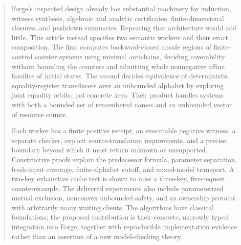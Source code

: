 \documentclass[11pt,a4paper]{article}
\theoremstyle{definition}
\theoremstyle{remark}
\begin{document}
\begin{abstract}
Forge's inspected design already has substantial machinery for induction,
witness synthesis, algebraic and analytic certificates, finite-dimensional
closures, and pushdown summaries. Repeating that architecture would add little.
This article instead specifies two semantic workers and their exact composition.
The first computes backward-closed unsafe regions of finite-control counter
systems using minimal antichains, deciding coverability without bounding the
counters and admitting whole nonnegative affine families of initial states.
The second decides equivalence of deterministic equality-register transducers
over an unbounded alphabet by exploring joint equality orbits, not concrete
keys. Their product handles systems with both a bounded set of remembered names
and an unbounded vector of resource counts.

Each worker has a finite positive receipt, an executable negative witness, a
separate checker, explicit source-translation requirements, and a precise
boundary beyond which it must return unknown or unsupported. Constructive
proofs explain the predecessor formula, parameter separation, fresh-input
coverage, finite-alphabet cutoff, and mixed-model transport. A two-key
exhaustive cache test is shown to miss a three-key, five-request counterexample.
The delivered experiments also include parameterized mutual exclusion,
nonconvex unbounded safety, and an ownership protocol with arbitrarily many
waiting clients. The algorithms have classical foundations; the proposed
contribution is their concrete, narrowly typed integration into Forge, together
with reproducible implementation evidence rather than an assertion of a new
model-checking theory.
\end{abstract}
\tableofcontents
\clearpage







\appendix


\end{document}
